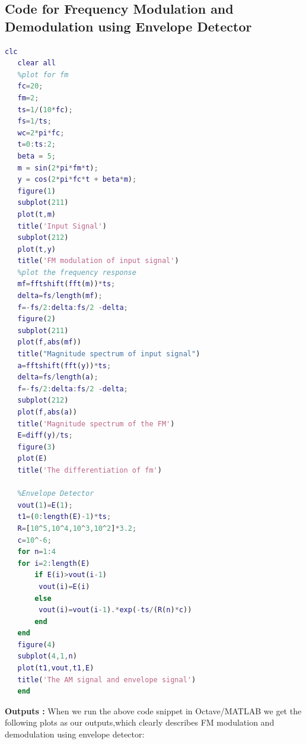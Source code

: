 \documentclass[12pt,a4paper]{article}%
\begin{document}
   \subsection{Code for Frequency Modulation and Demodulation using Envelope Detector }
   \lstset{numbers=none,breaklines=true,} 
   \begin{lstlisting}[language=MATLAB]
   clc
   clear all
   %plot for fm
   fc=20;
   fm=2;
   ts=1/(10*fc);
   fs=1/ts;
   wc=2*pi*fc;
   t=0:ts:2;
   beta = 5;
   m = sin(2*pi*fm*t);
   y = cos(2*pi*fc*t + beta*m);
   figure(1)
   subplot(211)
   plot(t,m)
   title('Input Signal')
   subplot(212)
   plot(t,y)
   title('FM modulation of input signal')
   %plot the frequency response
   mf=fftshift(fft(m))*ts;
   delta=fs/length(mf);
   f=-fs/2:delta:fs/2 -delta;
   figure(2)
   subplot(211)
   plot(f,abs(mf))
   title("Magnitude spectrum of input signal")
   a=fftshift(fft(y))*ts;
   delta=fs/length(a);
   f=-fs/2:delta:fs/2 -delta;
   subplot(212)
   plot(f,abs(a))
   title('Magnitude spectrum of the FM')
   E=diff(y)/ts;
   figure(3)
   plot(E)
   title('The differentiation of fm')
   
   %Envelope Detector
   vout(1)=E(1);
   t1=(0:length(E)-1)*ts;
   R=[10^5,10^4,10^3,10^2]*3.2;
   c=10^-6;
   for n=1:4
   for i=2:length(E)
	   if E(i)>vout(i-1)
	   	vout(i)=E(i)
	   else 
	   	vout(i)=vout(i-1).*exp(-ts/(R(n)*c))
	   end
   end
   figure(4)
   subplot(4,1,n)
   plot(t1,vout,t1,E)
   title('The AM signal and envelope signal')
   end
   \end{lstlisting}
   \large\textbf{Outputs : }
   \small When we run the above code snippet in Octave/MATLAB we get the following plots as our outputs,which clearly describes FM modulation and demodulation using envelope detector: \\\bigskip
   \centering
\end{document}
